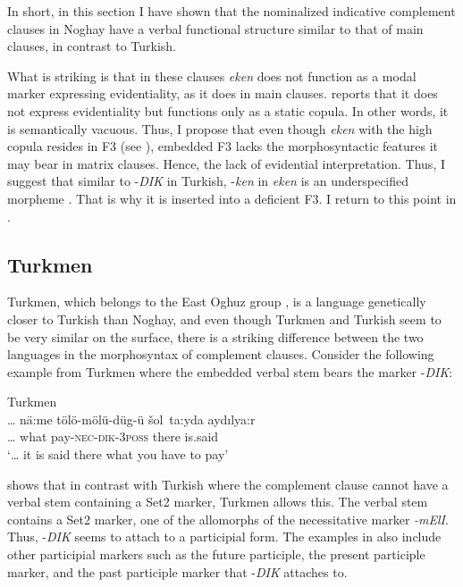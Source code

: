 \documentclass[output=paper]{langsci/langscibook}
\begin{document}
In short, in this section I have shown that the nominalized indicative complement clauses in Noghay have a verbal functional structure similar to that of main clauses, in contrast to Turkish. 

What is striking is that in these clauses \textit{eken} does not function as a modal marker expressing evidentiality, as it does in main clauses. 
\citet{Karakoc2001} reports that it does not express evidentiality but functions only as a static copula. 
In other words, it is semantically vacuous. 
Thus, I propose that even though \textit{eken} with the high copula resides in F3 (see ), embedded F3 lacks the morphosyntactic features it may bear in matrix clauses. 
Hence, the lack of evidential interpretation. 
Thus, I suggest that similar to -\textit{DIK} in Turkish, -\textit{ken} in \textit{eken} is an underspecified morpheme \citep{Kelepir2015}. 
That is why it is inserted into a deficient F3. 
I return to this point in .

\subsection{Turkmen}
\label{kelepirsec:key:2.4}

Turkmen, which belongs to the East Oghuz group \citep{Schonig1998,Johanson1998}, is a language genetically closer to Turkish than Noghay, and even though Turkmen and Turkish seem to be very similar on the surface, there is a striking difference between the two languages in the morphosyntax of complement clauses. 
Consider the following example from Turkmen where the embedded verbal stem bears the marker -\textit{DIK}:     

\ea Turkmen\\%
    \label{kelepirex:key:21}
    \gll \ldots{} nä:me tölö-mölü-düg-ü šol~ta:yda aydılya:r \\
    \ldots{} what pay-\textsc{nec}-\textsc{dik}-\textsc{3poss} there is.said \\
    \glt `\ldots{} it is said there what you have to pay' 
    \z

 shows that in contrast with Turkish where the complement clause cannot have a verbal stem containing a Set2 marker, Turkmen allows this. 
The verbal stem contains a Set2 marker, one of the allomorphs of the necessitative marker \textit{-mElI}. 
Thus, -\textit{DIK} seems to attach to a participial form. 
The examples in \citet[480-483]{Clark1998} also include other participial markers such as the future participle, the present participle marker, and the past participle marker that -\textit{DIK} attaches to.
\end{document}
